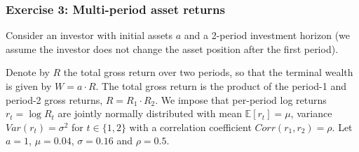 \documentclass{scrartcl}
\begin{document}
    \hypertarget{exercise-3-multi-period-asset-returns}{%
\subsubsection{Exercise 3: Multi-period asset
returns}\label{exercise-3-multi-period-asset-returns}}

Consider an investor with initial assets \(a\) and a 2-period investment
horizon (we assume the investor does not change the asset position after
the first period).

Denote by \(R\) the total gross return over two periods, so that the
terminal wealth is given by \(W = a\cdot R\). The total gross return is
the product of the period-1 and period-2 gross returns,
\(R = R_1\cdot R_2\). We impose that per-period log returns
\(r_t = \log R_t\) are jointly normally distributed with mean
\(\mathbb{E}[r_t] = \mu\), variance \(Var(r_t) = \sigma^2\) for
\(t\in\{1,2\}\) with a correlation coefficient \(Corr(r_1,r_2) = \rho\).
Let \(a = 1\), \(\mu = 0.04\), \(\sigma = 0.16\) and \(\rho = 0.5\).
\end{document}
